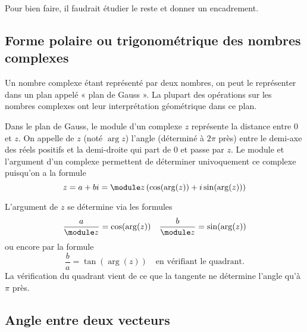 \begin{probleme}
    Pour bien faire, il faudrait étudier le reste et donner un encadrement.
\end{probleme}

\subsection[Forme trigonométrique des nombres complexes]{Forme polaire ou trigonométrique des nombres complexes}

Un nombre complexe étant représenté par deux nombres, on peut le représenter dans un plan appelé « plan de Gauss ». La plupart des opérations sur les nombres complexes ont leur interprétation géométrique dans ce plan.  

Dans le plan de Gauss, le module d'un complexe $z$ représente la distance entre $0$ et $z$. On appelle  de $z$ (noté $\arg z$) l'angle (déterminé à $2\pi$ près) entre le demi-axe des réels positifs et la demi-droite qui part de $0$ et passe par $z$. Le module et l'argument d'un complexe permettent de déterminer univoquement ce complexe puisqu'on a la formule
\[z = a + bi = \module z \left( \cos(\arg(z)) + i \sin(\arg(z)) \right)\]

L'argument de $z$ se détermine via les formules 
\[\frac a {\module z} = \cos(\arg(z)) \quad \frac b {\module z} = \sin(\arg(z))\]
ou encore par la formule
\[
\frac b a = \tan(\arg(z)) \quad \text{en vérifiant le quadrant.}
\]
La vérification du quadrant vient de ce que la tangente ne détermine l'angle qu'à $\pi$ près.

\subsection{Angle entre deux vecteurs}

